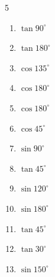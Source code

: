 \begin{multicols}{5}
\begin{enumerate}
\resetques

  \item $\displaystyle \tan{90^\circ}$

        \phantom{$\displaystyle なし$}

  \item $\displaystyle \tan{180^\circ}$

        \phantom{$\displaystyle =0$}

  \item $\displaystyle \cos{135^\circ}$


  \item $\displaystyle \cos{180^\circ}$

        \phantom{$\displaystyle =-1$}

  \item $\displaystyle \cos{180^\circ}$

        \phantom{$\displaystyle =-1$}

  \item $\displaystyle \cos{45^\circ}$


  \item $\displaystyle \sin{90^\circ}$

        \phantom{$\displaystyle =1$}

  \item $\displaystyle \tan{45^\circ}$

        \phantom{$\displaystyle =1$}

  \item $\displaystyle \sin{120^\circ}$


  \item $\displaystyle \sin{180^\circ}$

        \phantom{$\displaystyle =0$}

  \item $\displaystyle \tan{45^\circ}$

        \phantom{$\displaystyle =1$}

  \item $\displaystyle \tan{30^\circ}$


  \item $\displaystyle \sin{150^\circ}$


\end{enumerate}
\end{multicols}
